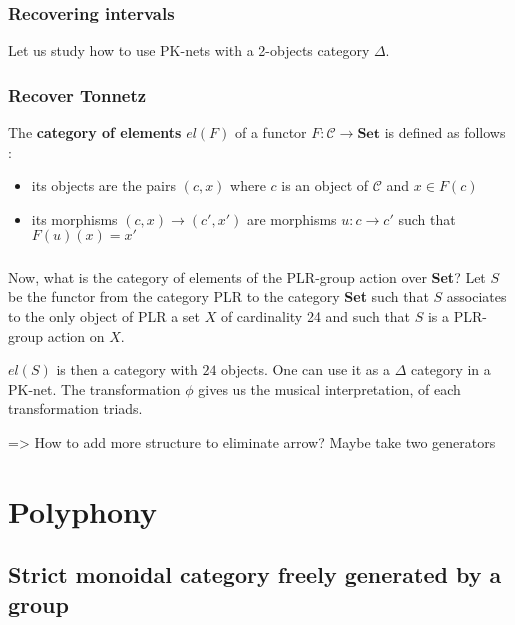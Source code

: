 \documentclass{report}
\begin{document}
\subsection{Recovering intervals}

Let us study how to use PK-nets with a 2-objects category $\Delta$.






\subsection{Recover Tonnetz}


\begin{defn} The \textbf{category of elements} $el(F)$ of a functor $F : \mathcal{C}\rightarrow \textbf{Set}$ is defined as follows :
    \begin{itemize}
        \item its objects are the pairs $(c,x)$ where $c$ is an object of $\mathcal{C}$ and $x\in F(c)$
        \item its morphisms $(c,x)\rightarrow (c',x')$ are morphisms $u : c\rightarrow c'$ such that $F(u)(x) = x'$
    \end{itemize}
\end{defn}
\paragraph{}
Now, what is the category of elements of the PLR-group action over \textbf{Set}? Let $S$ be the functor from the category PLR to the category \textbf{Set} such that $S$ associates to the only object of PLR a set $X$ of cardinality 24 and such that $S$ is a PLR-group action on $X$.

$el(S)$ is then a category with $24$ objects. One can use it as a $\Delta$ category in a PK-net. The transformation $\phi$ gives us the musical interpretation, of each transformation triads.

=> How to add more structure to eliminate arrow? Maybe take two generators

\chapter{Polyphony}
\section{Strict monoidal category freely generated by a group}
\end{document}
